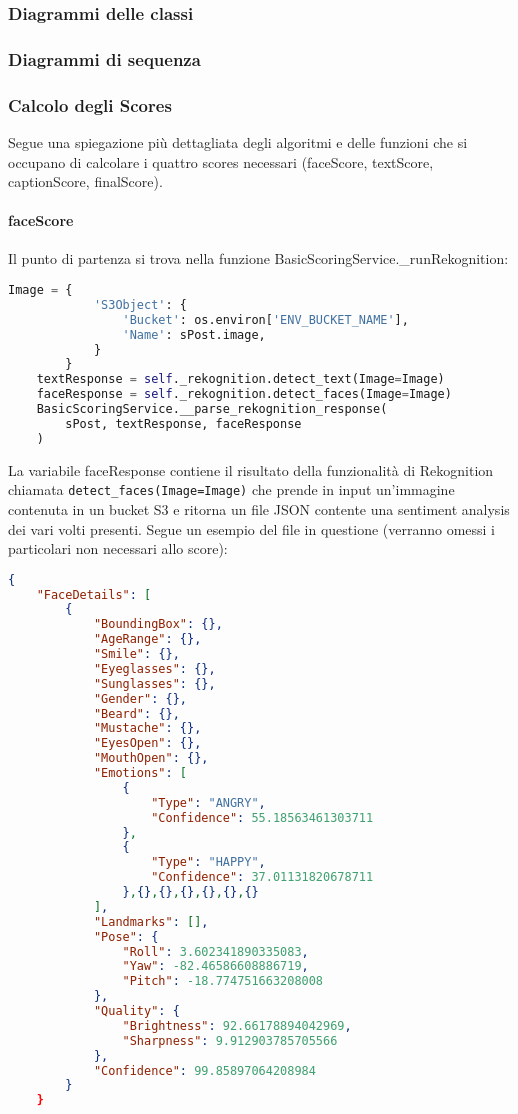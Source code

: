 \subsubsection{Diagrammi delle classi}
\subsubsection{Diagrammi di sequenza}
\subsubsection{Calcolo degli Scores}
Segue una spiegazione più dettagliata degli algoritmi e delle funzioni che si occupano di calcolare
i quattro scores necessari (faceScore, textScore, captionScore, finalScore).
\paragraph{faceScore} \aCapo
Il punto di partenza si trova nella funzione BasicScoringService.\_runRekognition:
\begin{lstlisting}[language=Python]
    Image = {
            'S3Object': {
                'Bucket': os.environ['ENV_BUCKET_NAME'],
                'Name': sPost.image,
            }
        }
    textResponse = self._rekognition.detect_text(Image=Image)
    faceResponse = self._rekognition.detect_faces(Image=Image)
    BasicScoringService.__parse_rekognition_response(
        sPost, textResponse, faceResponse
    )
\end{lstlisting}
La variabile faceResponse contiene il risultato della funzionalità
di Rekognition chiamata \verb+detect_faces(Image=Image)+ che prende in input un'immagine contenuta
in un bucket S3 e ritorna un file JSON contente una sentiment analysis dei vari volti presenti.
Segue un esempio del file in questione (verranno omessi i particolari non necessari allo score):
\begin{lstlisting}[language=JSON]
    {
    "FaceDetails": [
        {
            "BoundingBox": {},
            "AgeRange": {},
            "Smile": {},
            "Eyeglasses": {},
            "Sunglasses": {},
            "Gender": {},
            "Beard": {},
            "Mustache": {},
            "EyesOpen": {},
            "MouthOpen": {},
            "Emotions": [
                {
                    "Type": "ANGRY",
                    "Confidence": 55.18563461303711
                },
                {
                    "Type": "HAPPY",
                    "Confidence": 37.01131820678711
                },{},{},{},{},{},{}
            ],
            "Landmarks": [],
            "Pose": {
                "Roll": 3.602341890335083,
                "Yaw": -82.46586608886719,
                "Pitch": -18.774751663208008
            },
            "Quality": {
                "Brightness": 92.66178894042969,
                "Sharpness": 9.912903785705566
            },
            "Confidence": 99.85897064208984
        }
    }
\end{lstlisting}
